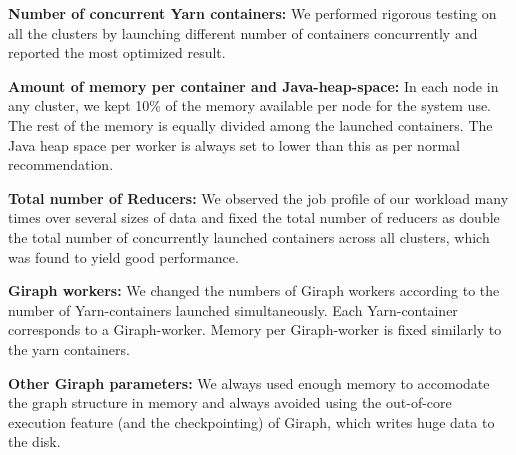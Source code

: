 \documentclass[conference]{IEEEtran}
\begin{document}
\textbf{Number of concurrent Yarn containers:} We performed rigorous testing on all the clusters by launching different number of containers concurrently and reported the most optimized result.

\textbf{Amount of memory per container and Java-heap-space:} In each node in any cluster, we kept 10\% of the memory available per node for the system use. The rest of the memory is equally divided among the launched containers. The Java heap space per worker is always set to lower than this as per normal recommendation.

\textbf{Total number of Reducers:} We observed the job profile of our workload many times over several sizes of data and fixed the total number of reducers as double the total number of concurrently launched containers across all clusters, which was found to yield good performance. 


\textbf{Giraph workers:} We changed the numbers of Giraph workers according to the number of Yarn-containers launched simultaneously. Each Yarn-container corresponds to a Giraph-worker. Memory per Giraph-worker is fixed similarly to the yarn containers.

\textbf{Other Giraph parameters:} We always used enough memory to accomodate the graph structure in memory and always avoided using the out-of-core execution feature (and the checkpointing) of Giraph, which writes huge data to the disk.
\end{document}
